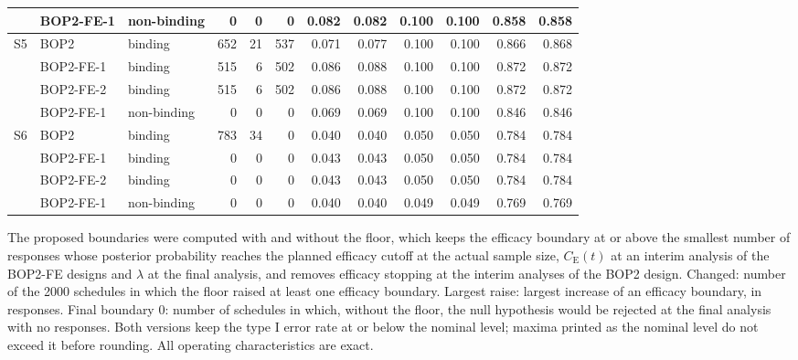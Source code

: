 \begin{table}
\begin{tabular}{lllrrrrrrrrr}
 & BOP2-FE-1 & non-binding & 0 & 0 & 0 & 0.082 & 0.082 & 0.100 & 0.100 & 0.858 & 0.858 \\
\midrule
S5 & BOP2 & binding & 652 & 21 & 537 & 0.071 & 0.077 & 0.100 & 0.100 & 0.866 & 0.868 \\
 & BOP2-FE-1 & binding & 515 & 6 & 502 & 0.086 & 0.088 & 0.100 & 0.100 & 0.872 & 0.872 \\
 & BOP2-FE-2 & binding & 515 & 6 & 502 & 0.086 & 0.088 & 0.100 & 0.100 & 0.872 & 0.872 \\
 & BOP2-FE-1 & non-binding & 0 & 0 & 0 & 0.069 & 0.069 & 0.100 & 0.100 & 0.846 & 0.846 \\
\midrule
S6 & BOP2 & binding & 783 & 34 & 0 & 0.040 & 0.040 & 0.050 & 0.050 & 0.784 & 0.784 \\
 & BOP2-FE-1 & binding & 0 & 0 & 0 & 0.043 & 0.043 & 0.050 & 0.050 & 0.784 & 0.784 \\
 & BOP2-FE-2 & binding & 0 & 0 & 0 & 0.043 & 0.043 & 0.050 & 0.050 & 0.784 & 0.784 \\
 & BOP2-FE-1 & non-binding & 0 & 0 & 0 & 0.040 & 0.040 & 0.049 & 0.049 & 0.769 & 0.769 \\
\bottomrule
\end{tabular}
\par\medskip
\begin{minipage}{0.95\textwidth}
\footnotesize
The proposed boundaries were computed with and without the floor, which keeps the efficacy boundary at or above the smallest number of responses whose posterior probability reaches the planned efficacy cutoff at the actual sample size, $C_{\mathrm{E}}(t)$ at an interim analysis of the BOP2-FE designs and $\lambda$ at the final analysis, and removes efficacy stopping at the interim analyses of the BOP2 design. Changed: number of the 2000 schedules in which the floor raised at least one efficacy boundary. Largest raise: largest increase of an efficacy boundary, in responses. Final boundary 0: number of schedules in which, without the floor, the null hypothesis would be rejected at the final analysis with no responses. Both versions keep the type I error rate at or below the nominal level; maxima printed as the nominal level do not exceed it before rounding. All operating characteristics are exact.
\end{minipage}
\end{table}
